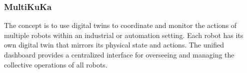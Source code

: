 \subsubsection{MultiKuKa}

The concept is to use digital twins to coordinate and monitor the actions of 
multiple robots within an industrial or automation setting. 
Each robot has its own digital twin that mirrors its physical state and actions. 
The unified dashboard provides a centralized interface for overseeing and managing the collective operations of all robots.